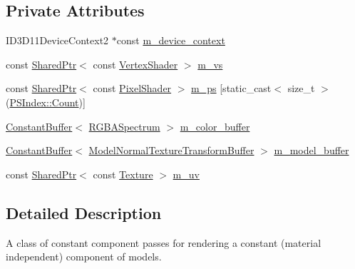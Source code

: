 \subsection*{Private Attributes}
\begin{DoxyCompactItemize}
\item 
I\+D3\+D11\+Device\+Context2 $\ast$const \hyperlink{classmage_1_1_constant_component_pass_af5a2ec9190b657a0e5cf3786c35f0336}{m\+\_\+device\+\_\+context}
\item 
const \hyperlink{namespacemage_a1e01ae66713838a7a67d30e44c67703e}{Shared\+Ptr}$<$ const \hyperlink{classmage_1_1_vertex_shader}{Vertex\+Shader} $>$ \hyperlink{classmage_1_1_constant_component_pass_aec78ab8193d28847ad591947f03f6515}{m\+\_\+vs}
\item 
const \hyperlink{namespacemage_a1e01ae66713838a7a67d30e44c67703e}{Shared\+Ptr}$<$ const \hyperlink{namespacemage_a27ecaf266420ee7a494d64edc0757129}{Pixel\+Shader} $>$ \hyperlink{classmage_1_1_constant_component_pass_a932366be8feba629aa2dd29a844e38b8}{m\+\_\+ps} \mbox{[}static\+\_\+cast$<$ size\+\_\+t $>$(\hyperlink{classmage_1_1_constant_component_pass_a5700234587f2aa0ebdb4f7790704f00bae93f994f01c537c4e2f7d8528c3eb5e9}{P\+S\+Index\+::\+Count})\mbox{]}
\item 
\hyperlink{structmage_1_1_constant_buffer}{Constant\+Buffer}$<$ \hyperlink{structmage_1_1_r_g_b_a_spectrum}{R\+G\+B\+A\+Spectrum} $>$ \hyperlink{classmage_1_1_constant_component_pass_aa1a97c7be7054c1a1362ca15d9909446}{m\+\_\+color\+\_\+buffer}
\item 
\hyperlink{structmage_1_1_constant_buffer}{Constant\+Buffer}$<$ \hyperlink{structmage_1_1_model_normal_texture_transform_buffer}{Model\+Normal\+Texture\+Transform\+Buffer} $>$ \hyperlink{classmage_1_1_constant_component_pass_a012197b5473955c356d2fbc48f9d3e8b}{m\+\_\+model\+\_\+buffer}
\item 
const \hyperlink{namespacemage_a1e01ae66713838a7a67d30e44c67703e}{Shared\+Ptr}$<$ const \hyperlink{classmage_1_1_texture}{Texture} $>$ \hyperlink{classmage_1_1_constant_component_pass_ad69f0d02de95b9125651b447cd8fd884}{m\+\_\+uv}
\end{DoxyCompactItemize}


\subsection{Detailed Description}
A class of constant component passes for rendering a constant (material independent) component of models. 

